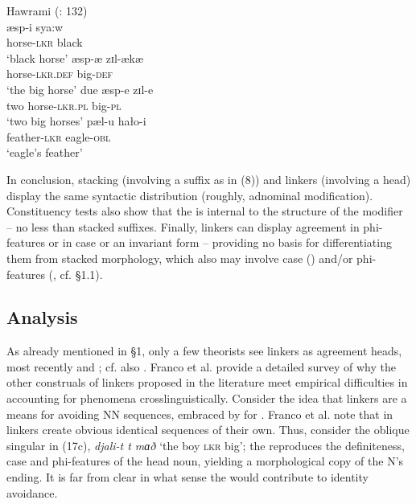 \documentclass[output=paper]{langsci/langscibook}
\begin{document}
\ea%
    Hawrami  (\citealt{Holmberg2008}: 132)\label{ex:manzini:20}\\
    \ea
    \gll æsp-i     sya:w      \\
         horse-\textsc{lkr}  black\\
    \glt ‘black horse’
    \ex
    \gll æsp{}-æ     zɪl-ækæ\\
         horse-\textsc{lkr.def}  big-\textsc{def}\\
    \glt ‘the big horse’ 
    \ex
    \gll due   æsp-e    zɪl-e \\
         two   horse-\textsc{lkr.pl}  big-\textsc{pl} \\
    \glt ‘two big horses’
    \ex
    \gll pæl-u     hało-i\\
         feather-\textsc{lkr}   eagle-\textsc{obl}\\
    \glt ‘eagle’s feather’ 
    \z
\z        

In conclusion, stacking (involving a suffix as in (8)) and linkers (involving a head) display the same syntactic distribution (roughly, adnominal modification). Constituency tests also show that the  is internal to the structure of the modifier – no less than stacked suffixes. Finally, linkers can display agreement in phi-features or in case or an invariant form – providing no basis for differentiating them from stacked morphology, which also may involve case () and\slash or phi-features (, cf. §1.1).

\subsection{Analysis}

As already mentioned in §1, only a few theorists see linkers as agreement heads, most recently \citet{Philip2012} and \citet{Franco2015}; cf. also \citet{Zwart2006}. Franco et al. provide a detailed survey of why the other construals of linkers proposed in the literature meet empirical difficulties in accounting for  phenomena crosslinguistically. Consider the idea that linkers are a means for avoiding NN sequences, embraced by \citet{Richards2010} for . Franco et al. note that in  linkers create obvious identical sequences of their own. Thus, consider the oblique singular in (17c), \textit{djali-t t mɑð} ‘the boy \textsc{lkr} big’; the  reproduces the definiteness, case and phi-features of the head noun, yielding a morphological copy of the N’s ending. It is far from clear in what sense the  would contribute to identity avoidance.
\end{document}

